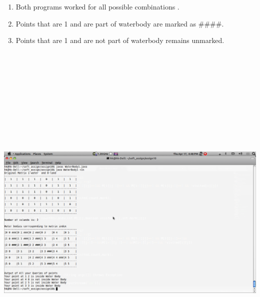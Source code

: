 \documentclass [12 pt ]{article}
\begin{document}
\begin{enumerate}
 \item Both programs worked for all possible combinations .
 \item Points that are 1 and are part of waterbody are marked as ####. 
 \item Points that are 1 and are not part of waterbody remains unmarked. 
 
 
\end{enumerate}
\includegraphics[height=18cm, width=15cm]{as.png}
 
\end{document}
